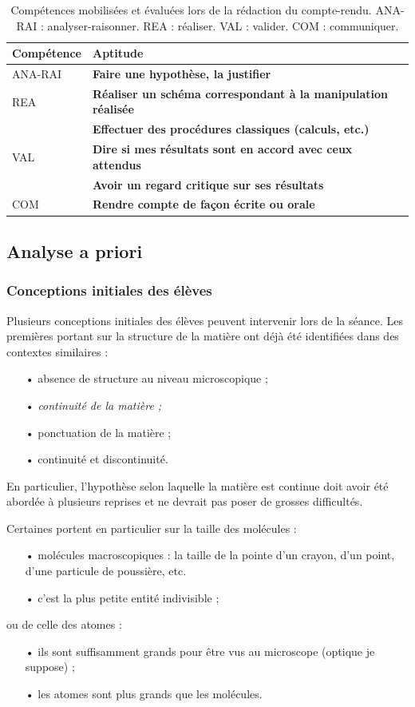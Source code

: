 \documentclass[12pt,a4paper, fleqn]{report}
\newcommand{\rea}{\colorbox{yellow_c}{\textcolor{yellow_f}{REA}}}
\newcommand{\anarai}{\colorbox{green_c}{\textcolor{green_f}{ANA-RAI}}}
\newcommand{\val}{\colorbox{orange_c}{\textcolor{orange_f}{VAL}}}
\newcommand{\com}{\colorbox{red_c}{\textcolor{red_f}{COM}}}
\begin{document}
\begin{table}[htbp]
\center
\begin{tabular}{l|l}
\textbf{Compétence} & \textbf{Aptitude} \\
\hline \hline
\anarai 	& \textbf{Faire une hypothèse, la justifier} \\
\hline
\rea			& \textbf{Réaliser un schéma correspondant à la manipulation réalisée} \\
				& \textbf{Effectuer des procédures classiques (calculs, etc.)} \\
\hline
\val			& \textbf{Dire si mes résultats sont en accord avec ceux attendus} \\
 				& \textbf{Avoir un regard critique sur ses résultats} \\
\hline
\com		& \textbf{Rendre compte de façon écrite ou orale}
\end{tabular}
\caption{Compétences mobilisées et évaluées lors de la rédaction du compte-rendu.
\anarai{} : analyser-raisonner.
\rea{} : réaliser.
\val{} : valider.
\com{} : communiquer.}
\label{tab:cptces_cr}
\end{table}

\subsection{Analyse a priori}

\subsubsection{Conceptions initiales des élèves}

Plusieurs conceptions initiales des élèves peuvent intervenir lors de la séance.
Les premières portant sur la structure de la matière ont déjà été identifiées dans des contextes similaires \cite{Bain1985} :
\begin{itemize}
\item[•] absence de structure au niveau microscopique ;
\item[•] \emph{continuité de la matière ;}
\item[•] ponctuation de la matière ;
\item[•] continuité et discontinuité.
\end{itemize}
En particulier, l'hypothèse selon laquelle la matière est continue doit avoir été abordée à plusieurs reprises et ne devrait pas poser de grosses difficultés.

Certaines portent en particulier sur la taille des molécules \cite{Griffiths1992} :
\begin{itemize}
\item[•] molécules \og macroscopiques \fg{} : la taille de la pointe d'un crayon, d'un point, d'une particule de poussière, etc. 
\item[•] c'est la plus petite entité indivisible ;
\end{itemize}
ou de celle des atomes :
\begin{itemize}
\item[•] ils sont suffisamment grands pour être vus au microscope (optique je suppose) ;
\item[•] les atomes sont plus grands que les molécules.
\end{itemize}
\end{document}
